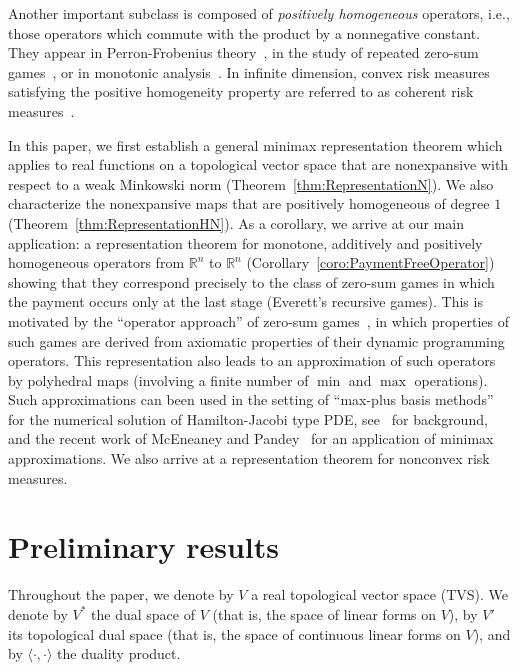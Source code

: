 \documentclass[a4paper,11pt]{amsart}
\theoremstyle{definition}
\theoremstyle{remark}
\begin{document}
Another important subclass is composed of {\em positively homogeneous} operators, i.e.,
those operators which commute with the product by a nonnegative constant.
They appear in Perron-Frobenius theory~\cite{GG04}, in the study of repeated zero-sum games~\cite{RS01a},
or in monotonic analysis~\cite{DMLR04}.
In infinite dimension, convex risk measures satisfying the positive homogeneity property
are referred to as coherent risk measures~\cite{ADEH99,Del02}.

In this paper, we first establish a general minimax representation theorem
which applies to real functions on a topological vector space
that are nonexpansive with respect to a weak Minkowski norm (Theorem~\ref{thm:RepresentationN}). 
We also characterize the nonexpansive maps that are positively homogeneous of degree $1$
(Theorem~\ref{thm:RepresentationHN}).
As a corollary, we arrive at our main application:
a representation theorem for monotone, additively
and positively homogeneous operators from ${\mathbb{R}}^n$ to ${\mathbb{R}}^n$ (Corollary~\ref{coro:PaymentFreeOperator})
showing that they correspond precisely to the class of zero-sum games in which the payment occurs only at the last stage (Everett's recursive games). This is
motivated by the ``operator approach'' of zero-sum games~\cite{RS01a}, 
in which properties of such games are derived from axiomatic
properties of their dynamic programming operators. 
This representation also leads to an approximation of such operators by polyhedral maps (involving a finite number of $\min$ and $\max$ operations). 
Such approximations can been used in the setting of ``max-plus basis methods'' for the numerical solution of Hamilton-Jacobi type PDE,
see~\cite{bookofmac,AGL08} for background, and the recent work of McEneaney and Pandey~\cite{McEP15} for an application of minimax approximations. 
We also arrive at a representation theorem for nonconvex risk measures.

\section{Preliminary results}
\label{sec:PreliminaryResults}

Throughout the paper, we denote by $V$ a real topological vector space (TVS).
We denote by $V^*$ the dual space of $V$ (that is, the space of linear forms on $V$), by $V'$ its topological dual space (that is, the space of continuous linear forms on $V$), and by ${\langle \cdot, \cdot\rangle}$ the duality product.
\end{document}
